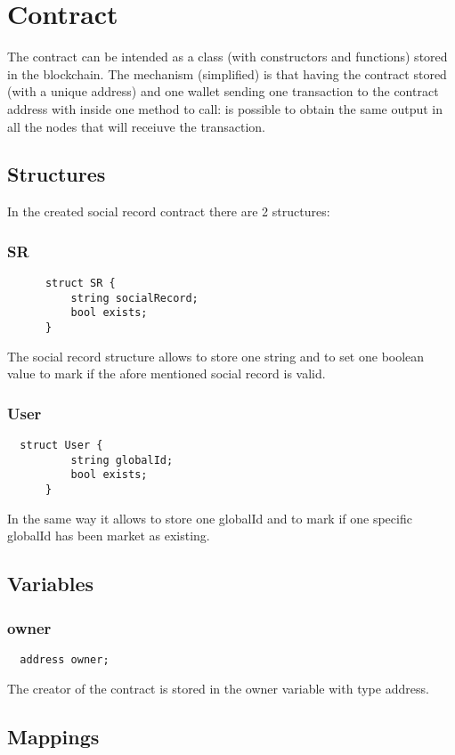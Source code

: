 \section{Contract}
The contract can be intended as a class (with constructors and functions) stored in the blockchain.
The mechanism (simplified) is that having the contract stored (with a unique address) and one wallet sending one transaction to the contract address with inside one method to call: is possible to obtain the same output in all the nodes that will receiuve the transaction.

\subsection{Structures}
In the created social record contract there are 2 structures:

\subsubsection{SR}
\begin{lstlisting}
      struct SR {
          string socialRecord;
          bool exists;
      }
\end{lstlisting}
The social record structure allows to store one string and to set one boolean value to mark if the afore mentioned social record is valid.

\subsubsection{User}
\begin{lstlisting}
  struct User {
          string globalId;
          bool exists;
      }
\end{lstlisting}
In the same way it allows to store one globalId and to mark if one specific globalId has been market as existing.

\subsection{Variables}
\subsubsection{owner}
\begin{lstlisting}
  address owner;
\end{lstlisting}
The creator of the contract is stored in the owner variable with type address.

\subsection{Mappings}
